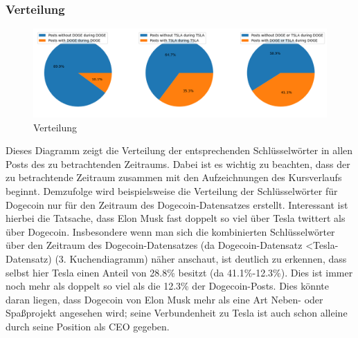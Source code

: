 \documentclass{article}
\begin{document}
\subsubsection{Verteilung}
\begin{figure}[h]
  	\centering
  	\includegraphics[width=\textwidth]{./imgs/Verteilung.png}
 	\caption{Verteilung}
 	\label{fig:Verteilung}
\end{figure}
Dieses Diagramm zeigt die Verteilung der entsprechenden Schlüsselwörter in allen Posts des zu betrachtenden Zeitraums.
Dabei ist es wichtig zu beachten, dass der zu betrachtende Zeitraum zusammen mit den Aufzeichnungen des Kursverlaufs beginnt.
Demzufolge wird beispielsweise die Verteilung der Schlüsselwörter für Dogecoin nur für den Zeitraum des Dogecoin-Datensatzes erstellt.
Interessant ist hierbei die Tatsache, dass Elon Musk fast doppelt so viel über Tesla twittert als über Dogecoin.
Insbesondere wenn man sich die kombinierten Schlüsselwörter über den Zeitraum des Dogecoin-Datensatzes (da Dogecoin-Datensatz \textless Tesla-Datensatz) (3. Kuchendiagramm) näher anschaut, ist deutlich zu erkennen, dass selbst hier Tesla einen Anteil von 28.8\% besitzt (da 41.1\%-12.3\%).
Dies ist immer noch mehr als doppelt so viel als die 12.3\% der Dogecoin-Posts.
Dies könnte daran liegen, dass Dogecoin von Elon Musk mehr als eine Art Neben- oder Spaßprojekt angesehen wird; seine Verbundenheit zu Tesla ist auch schon alleine durch seine Position als CEO gegeben.
\end{document}
